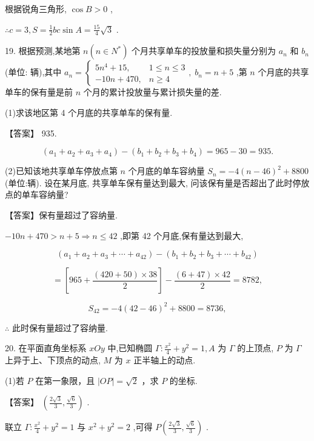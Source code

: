 \documentclass[10pt]{article}
\begin{document}
根据锐角三角形, \(\cos B > 0\) ,

\(\therefore c = 3,S = \frac{1}{2}{bc}\sin A = \frac{15}{4}\sqrt{3}\) .

19. 根据预测,某地第 \(n\left( {n \in  {N}^{ * }}\right)\) 个月共享单车的投放量和损失量分别为 \({a}_{n}\) 和 \({b}_{n}\) (单位: 辆),其中 \({a}_{n} = \left\{  {\begin{array}{ll} 5{n}^{4} + {15}, & 1 \leq  n \leq  3 \\   - {10n} + {470}, & n \geq  4 \end{array},\;{b}_{n} = n + 5}\right.\) ,第 \(n\) 个月底的共享单车的保有量是前 \(n\) 个月的累计投放量与累计损失量的差.

(1)求该地区第 4 个月底的共享单车的保有量.

【答案】 935.

\[
\left( {{a}_{1} + {a}_{2} + {a}_{3} + {a}_{4}}\right)  - \left( {{b}_{1} + {b}_{2} + {b}_{3} + {b}_{4}}\right)  = {965} - {30} = {935}.
\]

(2)已知该地共享单车停放点第 \(n\) 个月底的单车容纳量 \({S}_{n} =  - 4{\left( n - {46}\right) }^{2} + {8800}\) (单位:辆). 设在某月底, 共享单车保有量达到最大, 问该保有量是否超出了此时停放点的单车容纳量?

【答案】保有量超过了容纳量.

\(- {10n} + {470} > n + 5 \Rightarrow  n \leq  {42}\) ,即第 42 个月底,保有量达到最大,

\[
\left( {{a}_{1} + {a}_{2} + {a}_{3} + \cdots  + {a}_{42}}\right)  - \left( {{b}_{1} + {b}_{2} + {b}_{3} + \cdots  + {b}_{42}}\right)
\]

\[
= \left\lbrack  {{965} + \frac{\left( {{420} + {50}}\right)  \times  {38}}{2}}\right\rbrack   - \frac{\left( {6 + {47}}\right)  \times  {42}}{2} = {8782},
\]

\[
{S}_{42} =  - 4{\left( {42} - {46}\right) }^{2} + {8800} = {8736},
\]

\(\therefore\) 此时保有量超过了容纳量.

20. 在平面直角坐标系 \({xOy}\) 中,已知椭圆 \(\Gamma  : \frac{{x}^{2}}{4} + {y}^{2} = 1,A\) 为 \(\Gamma\) 的上顶点, \(P\) 为 \(\Gamma\) 上异于上、下顶点的动点, \(M\) 为 \(x\) 正半轴上的动点.

(1)若 \(P\) 在第一象限，且 \(\left| {OP}\right|  = \sqrt{2}\) ，求 \(P\) 的坐标.

【答案】 \(\left( {\frac{2\sqrt{3}}{3},\frac{\sqrt{6}}{3}}\right)\) .

联立 \(\Gamma  : \frac{{x}^{2}}{4} + {y}^{2} = 1\) 与 \({x}^{2} + {y}^{2} = 2\) ,可得 \(P\left( {\frac{2\sqrt{3}}{3},\frac{\sqrt{6}}{3}}\right)\) .
\end{document}
